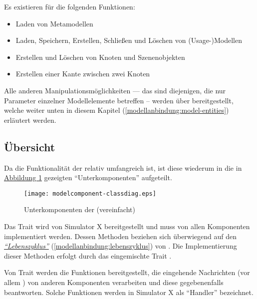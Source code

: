 \documentclass[a4paper,10pt]{sphinxmanual}
\begin{document}
Es existieren  für die folgenden Funktionen:
\begin{itemize}
\item {} 
Laden von Metamodellen

\item {} 
Laden, Speichern, Erstellen, Schließen und Löschen von (Usage-)Modellen

\item {} 
Erstellen und Löschen von Knoten und Szenenobjekten

\item {} 
Erstellen einer Kante zwischen zwei Knoten

\end{itemize}

Alle anderen Manipulationsmöglichkeiten — das sind diejenigen, die nur Parameter einzelner Modellelemente betreffen – werden über  bereitgestellt, welche weiter unten in diesem Kapitel {\hyperref[modellanbindung:model-entities]{\emph{}}} (\autoref*{modellanbindung:model-entities}) erläutert werden.


\subsection{Übersicht}
\label{modellanbindung:ubersicht}
Da die Funktionalität der  relativ umfangreich ist, ist diese wiederum in die in  \hyperref[modellanbindung:modelcomponent-classdiag]{Abbildung  \ref*{modellanbindung:modelcomponent-classdiag}} gezeigten "`Unterkomponenten"' aufgeteilt.
\begin{figure}[htbp]
\centering
\capstart

\texttt{[image: modelcomponent-classdiag.eps]}
\caption{Unterkomponenten der  (vereinfacht)}\label{modellanbindung:modelcomponent-classdiag}\end{figure}

Das Trait  wird von Simulator X bereitgestellt und muss von allen Komponenten implementiert werden.
Dessen Methoden beziehen sich überwiegend auf den {\hyperref[modellanbindung:lebenszyklus]{\emph{"`Lebenszyklus"'}}} (\autoref*{modellanbindung:lebenszyklus}) von .
Die Implementierung dieser Methoden erfolgt durch das eingemischte Trait .

Von Trait  werden die Funktionen bereitgestellt, die eingehende Nachrichten (vor allem ) von anderen Komponenten verarbeiten und diese gegebenenfalls beantworten.
Solche Funktionen werden in Simulator X als "`Handler"' bezeichnet.
\end{document}
